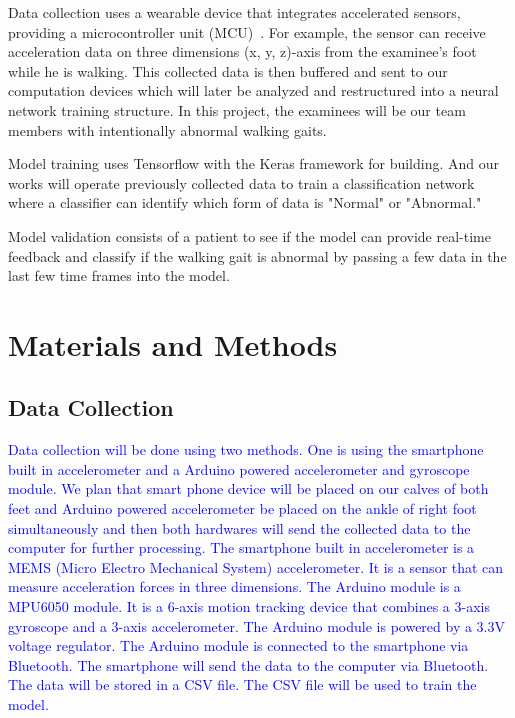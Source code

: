 \documentclass[10pt,twocolumn,letterpaper]{article}
\begin{document}
Data collection uses a wearable device that integrates accelerated sensors, providing a microcontroller unit (MCU)~\cite{pardoel2019wearable}. For example, the sensor can receive acceleration data on three dimensions (x, y, z)-axis from the examinee's foot while he is walking. This collected data is then buffered and sent to our computation devices which will later be analyzed and restructured into a neural network training structure. In this project, the examinees will be our team members with intentionally abnormal walking gaits.

Model training uses Tensorflow with the Keras framework for building. And our works will operate previously collected data to train a classification network where a classifier can identify which form of data is "Normal" or "Abnormal."~\cite{s21020614,8789488}

Model validation consists of a patient to see if the model can provide real-time feedback and classify if the walking gait is abnormal by passing a few data in the last few time frames into the model.

\section{Materials and Methods}
\label{sec:materials}

\subsection{Data Collection}
\label{sec:data_collection}

\textcolor{blue}{
    Data collection will be done using two methods. One is using the smartphone built in accelerometer and a Arduino powered accelerometer and gyroscope module. We plan that smart phone device will be placed on our calves of both feet and Arduino powered accelerometer be placed on the ankle of right foot simultaneously and then both hardwares will send the collected data to the computer for further processing.
    The smartphone built in accelerometer is a MEMS (Micro Electro Mechanical System) accelerometer. It is a sensor that can measure acceleration forces in three dimensions. The Arduino module is a MPU6050 module. It is a 6-axis motion tracking device that combines a 3-axis gyroscope and a 3-axis accelerometer. The Arduino module is powered by a 3.3V voltage regulator. The Arduino module is connected to the smartphone via Bluetooth. The smartphone will send the data to the computer via Bluetooth. The data will be stored in a CSV file. The CSV file will be used to train the model.
}
\end{document}
